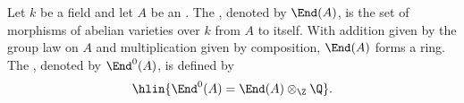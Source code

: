 \begin{definition} \label{definition:endomorphism_algebra_up_to_isogeny_of_an_abelian_variety_over_a_field}
    Let $k$ be a field and let $A$ be an . The , denoted by $\End(A)$, is the set of morphisms of abelian varieties over $k$ from $A$ to itself. With addition given by the group law on $A$ and multiplication given by composition, $\End(A)$ forms a ring. The , denoted by $\End^0(A)$, is defined by
    $$\hlin{\End^0(A) = \End(A) \otimes_{\Z} \Q}.$$
\end{definition}
